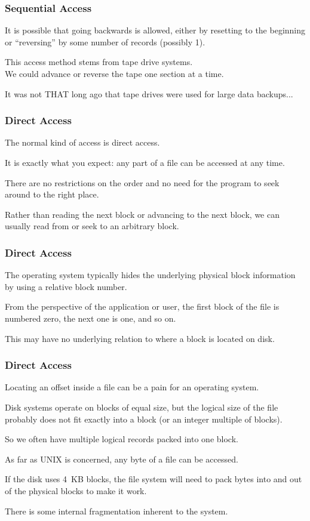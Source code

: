 \begin{frame}
\frametitle{Sequential Access}

 It is possible that going backwards is allowed, either by resetting to the beginning or ``reversing'' by some number of records (possibly 1). 
 
 This access method stems from tape drive systems.\\
 \quad We could advance or reverse the tape one section at a time.
  
It was not THAT long ago that tape drives were used for large data backups...


\end{frame}

\begin{frame}
\frametitle{Direct Access}

The normal kind of access is \alert{direct access}.

 It is exactly what you expect: any part of a file can be accessed at any time. 
 
There are no restrictions on the order and no need for the program to seek around to the right place. 

Rather than reading the next block or advancing to the next block, we can usually read from or seek to an arbitrary block. 


\end{frame}

\begin{frame}
\frametitle{Direct Access}

The operating system typically hides the underlying physical block information by using a relative block number. 

From the perspective of the application or user, the first block of the file is numbered zero, the next one is one, and so on. 

This may have no underlying relation to where a block is located on disk.


\end{frame}

\begin{frame}
\frametitle{Direct Access}

Locating an offset inside a file can be a pain for an operating system. 

Disk systems operate on blocks of equal size, but the logical size of the file probably does not fit exactly into a block (or an integer multiple of blocks). 

So we often have multiple logical records packed into one block. 

As far as UNIX is concerned, any byte of a file can be accessed. 

If the disk uses 4~KB blocks, the file system will need to pack bytes into and out of the physical blocks to make it work.

There is some internal fragmentation inherent to the system.

\end{frame}

